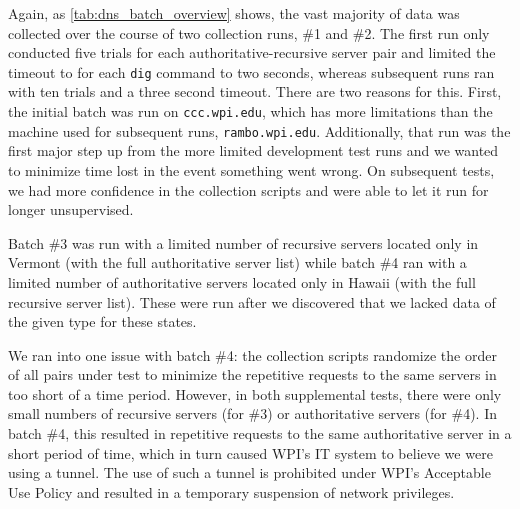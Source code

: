 Again, as \cref{tab:dns_batch_overview} shows, the vast majority of data was collected over the course of two collection runs, \#1 and \#2. The first run only conducted five trials for each authoritative-recursive server pair and limited the timeout to for each \texttt{dig} command to two seconds, whereas subsequent runs ran with ten trials and a three second timeout. There are two reasons for this. First, the initial batch was run on \texttt{ccc.wpi.edu}, which has more limitations than the machine used for subsequent runs, \texttt{rambo.wpi.edu}. Additionally, that run was the first major step up from the more limited development test runs and we wanted to minimize time lost in the event something went wrong. On subsequent tests, we had more confidence in the collection scripts and were able to let it run for longer unsupervised.

Batch \#3 was run with a limited number of recursive servers located only in Vermont (with the full authoritative server list) while batch \#4 ran with a limited number of authoritative servers located only in Hawaii (with the full recursive server list). These were run after we discovered that we lacked data of the given type for these states. 

We ran into one issue with batch \#4: the collection scripts randomize the order of all pairs under test to minimize the repetitive requests to the same \dns servers in too short of a time period. However, in both supplemental tests, there were only small numbers of recursive servers (for \#3) or authoritative servers (for \#4). In batch \#4, this resulted in repetitive requests to the same authoritative server in a short period of time, which in turn caused WPI's IT system to believe we were using a \dns tunnel. The use of such a tunnel is prohibited under WPI's Acceptable Use Policy and resulted in a temporary suspension of network privileges.





